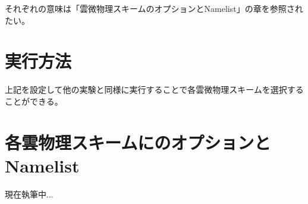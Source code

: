 それぞれの意味は「雲微物理スキームのオプションとNamelist」の章を参照されたい。


\section{実行方法}
上記を設定して他の実験と同様に実行することで各雲微物理スキームを選択することができる。



\section{各雲物理スキームにのオプションとNamelist}
現在執筆中...


